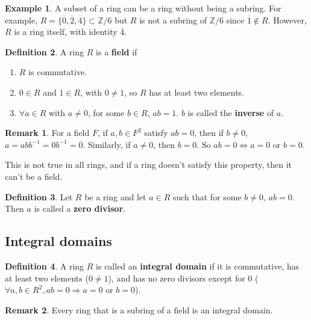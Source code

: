 \documentclass[12pt,a4paper]{article}
\theoremstyle{definition}
\newtheorem{definition}{Definition}[subsection]
\newtheorem{example}[definition]{Example}
\newtheorem*{remark}{Remark}
\begin{document}
\begin{example}
	A subset of a ring can be a ring without being a subring. For example, $R = \{ \overline{0}, \overline{2}, \overline{4} \} \subset \mathbb{Z} / 6$ but $R$ is not a subring of $\mathbb{Z} / 6$ since $\overline{1} \notin R$. However, $R$ is a ring itself, with identity $\overline{4}$.
\end{example}

\begin{definition}
	A ring $R$ is a \textbf{field} if
	\begin{enumerate}
		\item $R$ is commutative.
		\item $0 \in R$ and $1 \in R$, with $0 \ne 1$, so $R$ has at least two elements.
		\item $\forall a \in R$ with $a \ne 0$, for some $b \in R$, $ab = 1$. $b$ is called the \textbf{inverse} of $a$.
	\end{enumerate}
\end{definition}

\begin{remark}
	For a field $F$, if $a, b \in F^2$ satisfy $ab = 0$, then if $b \ne 0$, $a = ab b^{-1} = 0 b^{-1} = 0$. Similarly, if $a \ne 0$, then $b = 0$. So $ab = 0 \Longleftrightarrow a = 0 \text{ or } b = 0$.

	This is not true in all rings, and if a ring doesn't satisfy this property, then it can't be a field.
\end{remark}

\begin{definition}
	Let $R$ be a ring and let $a \in R$ such that for some $b \ne 0$, $ab = 0$. Then $a$ is called a \textbf{zero divisor}.
\end{definition}

\subsection{Integral domains}

\begin{definition}\label{def:integralDomain}
	A ring $R$ is called an \textbf{integral domain} if it is commutative, has at least two elements ($0 \ne 1$), and has no zero divisors except for $0$ ($\forall a, b \in R^2, ab = 0 \Longrightarrow a = 0 \text{ or } b = 0$).
\end{definition}

\begin{remark}
	Every ring that is a subring of a field is an integral domain.
\end{remark}
\end{document}

